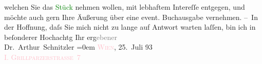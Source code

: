                     welchen Sie das \textcolor{green}{Stück}{}\ledrightnote{\textcolor{green}{Das Märchen. Schauspiel in drei Aufzügen}} nehmen wollen, mit
                    lebhaftem Intereſſe entgegen, und möchte auch gern Ihre Äußerung über eine
                    event. Buchausgabe vernehmen.\pend
           \pstart
           – In der Hoffnung, daſs {\pb}Sie mich nicht zu lange auf
                    Antwort warten laſſen, bin ich in beſonderer Hochachtg\pend
           \pstart
           Ihr erg\textcolor{gray}{ebener}{\\[\baselineskip]}\spacefill\mbox{Dr. Arthur Schnitzler}\pend
           \leftskip=0em{}\pstart
           \textsc{\textcolor{pink}{Wien}{}\ledrightnote{\textcolor{pink}{Wien}}}, 25. Juli 93{\\}\textcolor{pink}{\textsc{I. Grillparzerstraße 7}}{}\ledrightnote{\textcolor{pink}{Grillparzerstraße}}\pend
           \endnumbering{}  
      